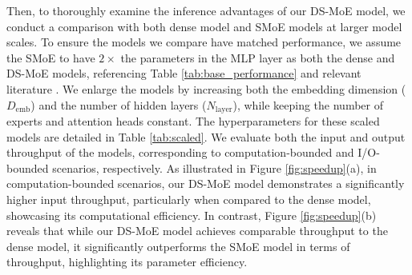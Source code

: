 Then, to thoroughly examine the inference advantages of our DS-MoE model, we conduct a comparison with both dense model and SMoE models at larger model scales. To ensure the models we compare have matched performance, we assume the SMoE to have $2\times$ the parameters in the MLP layer as both the dense and DS-MoE models, referencing Table \ref{tab:base_performance} and relevant literature \cite{dai2024deepseekmoe, shen2023moduleformer}. We enlarge the models by increasing both the embedding dimension ($D_{\text{emb}}$) and the number of hidden layers ($N_{\text{layer}}$), while keeping the number of experts and attention heads constant. The hyperparameters for these scaled models are detailed in Table \ref{tab:scaled}. We evaluate both the input and output throughput of the models, corresponding to computation-bounded and I/O-bounded scenarios, respectively. As illustrated in Figure \ref{fig:speedup}(a), in computation-bounded scenarios, our DS-MoE model demonstrates a significantly higher input throughput, particularly when compared to the dense model, showcasing its computational efficiency. In contrast, Figure \ref{fig:speedup}(b) reveals that while our DS-MoE model achieves comparable throughput to the dense model, it significantly outperforms the SMoE model in terms of throughput, highlighting its parameter efficiency.

